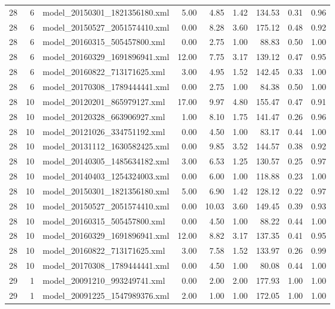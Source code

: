 \begin{table}[ht]
\begin{tabular}{rrlrrrrrr}
   28 &   6 & model\_20150301\_1821356180.xml & 5.00 & 4.85 & 1.42 & 134.53 & 0.31 & 0.96 \\ 
   28 &   6 & model\_20150527\_2051574410.xml & 0.00 & 8.28 & 3.60 & 175.12 & 0.48 & 0.92 \\ 
   28 &   6 & model\_20160315\_505457800.xml & 0.00 & 2.75 & 1.00 & 88.83 & 0.50 & 1.00 \\ 
   28 &   6 & model\_20160329\_1691896941.xml & 12.00 & 7.75 & 3.17 & 139.12 & 0.47 & 0.95 \\ 
   28 &   6 & model\_20160822\_713171625.xml & 3.00 & 4.95 & 1.52 & 142.45 & 0.33 & 1.00 \\ 
   28 &   6 & model\_20170308\_1789444441.xml & 0.00 & 2.75 & 1.00 & 84.38 & 0.50 & 1.00 \\ 
   28 &  10 & model\_20120201\_865979127.xml & 17.00 & 9.97 & 4.80 & 155.47 & 0.47 & 0.91 \\ 
   28 &  10 & model\_20120328\_663906927.xml & 1.00 & 8.10 & 1.75 & 141.47 & 0.26 & 0.96 \\ 
   28 &  10 & model\_20121026\_334751192.xml & 0.00 & 4.50 & 1.00 & 83.17 & 0.44 & 1.00 \\ 
   28 &  10 & model\_20131112\_1630582425.xml & 0.00 & 9.85 & 3.52 & 144.57 & 0.38 & 0.92 \\ 
   28 &  10 & model\_20140305\_1485634182.xml & 3.00 & 6.53 & 1.25 & 130.57 & 0.25 & 0.97 \\ 
   28 &  10 & model\_20140403\_1254324003.xml & 0.00 & 6.00 & 1.00 & 118.88 & 0.23 & 1.00 \\ 
   28 &  10 & model\_20150301\_1821356180.xml & 5.00 & 6.90 & 1.42 & 128.12 & 0.22 & 0.97 \\ 
   28 &  10 & model\_20150527\_2051574410.xml & 0.00 & 10.03 & 3.60 & 149.45 & 0.39 & 0.93 \\ 
   28 &  10 & model\_20160315\_505457800.xml & 0.00 & 4.50 & 1.00 & 88.22 & 0.44 & 1.00 \\ 
   28 &  10 & model\_20160329\_1691896941.xml & 12.00 & 8.82 & 3.17 & 137.35 & 0.41 & 0.95 \\ 
   28 &  10 & model\_20160822\_713171625.xml & 3.00 & 7.58 & 1.52 & 133.97 & 0.26 & 0.99 \\ 
   28 &  10 & model\_20170308\_1789444441.xml & 0.00 & 4.50 & 1.00 & 80.08 & 0.44 & 1.00 \\ 
   29 &   1 & model\_20091210\_993249741.xml & 0.00 & 2.00 & 2.00 & 177.93 & 1.00 & 1.00 \\ 
   29 &   1 & model\_20091225\_1547989376.xml & 2.00 & 1.00 & 1.00 & 172.05 & 1.00 & 1.00 \\ 

\end{tabular}
\end{table}
